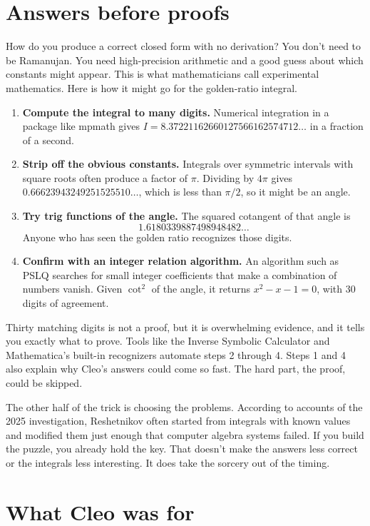 \documentclass[11pt]{article}
\begin{document}
\section*{Answers before proofs}

How do you produce a correct closed form with no derivation? You don't need to be Ramanujan. You need high-precision arithmetic and a good guess about which constants might appear. This is what mathematicians call experimental mathematics. Here is how it might go for the golden-ratio integral.

\begin{enumerate}[leftmargin=*]
\item \textbf{Compute the integral to many digits.} Numerical integration in a package like mpmath gives $I=8.37221162660127566162574712\ldots$ in a fraction of a second.
\item \textbf{Strip off the obvious constants.} Integrals over symmetric intervals with square roots often produce a factor of $\pi$. Dividing by $4\pi$ gives $0.66623943249251525510\ldots$, which is less than $\pi/2$, so it might be an angle.
\item \textbf{Try trig functions of the angle.} The squared cotangent of that angle is \[1.6180339887498948482\ldots\] Anyone who has seen the golden ratio recognizes those digits.
\item \textbf{Confirm with an integer relation algorithm.} An algorithm such as PSLQ searches for small integer coefficients that make a combination of numbers vanish. Given $\cot^2$ of the angle, it returns $x^2-x-1=0$, with 30 digits of agreement.
\end{enumerate}

Thirty matching digits is not a proof, but it is overwhelming evidence, and it tells you exactly what to prove. Tools like the Inverse Symbolic Calculator and Mathematica's built-in recognizers automate steps 2 through 4. Steps 1 and 4 also explain why Cleo's answers could come so fast. The hard part, the proof, could be skipped.

The other half of the trick is choosing the problems. According to accounts of the 2025 investigation, Reshetnikov often started from integrals with known values and modified them just enough that computer algebra systems failed. If you build the puzzle, you already hold the key. That doesn't make the answers less correct or the integrals less interesting. It does take the sorcery out of the timing.

\section*{What Cleo was for}
\end{document}
